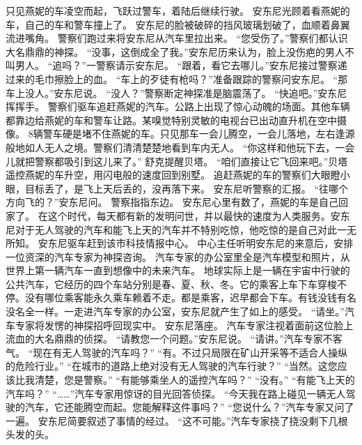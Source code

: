 \documentclass[a4paper,12pt,UTF8,twoside]{ctexbook}
\begin{document}
        只见燕妮的车凌空而起，飞跃过警车，着陆后继续行驶。 
        安东尼光顾着看燕妮的车，自己的车和警车撞上了。 
        安东尼的脸被破碎的挡风玻璃划破了，血顺着鼻翼流进嘴角。 
        警察们跑过来将安东尼从汽车里拉出来。 
        “您受伤了。”警察们都认识大名鼎鼎的神探。 
        “没事，这倒成全了我。”安东尼历来认为，脸上没伤疤的男人不叫男人。 
        “追吗？”一警察请示安东尼。 
        “跟着，看它去哪儿。”安东尼接过警察递过来的毛巾擦脸上的血。 
        “车上的歹徒有枪吗？”准备跟踪的警察问安东尼。 
        “那车上没人。”安东尼说。 
        “没人？”警察断定神探准是脑震荡了。 
        “快追吧。”安东尼挥挥手。 
        警察们驱车追赶燕妮的汽车。公路上出现了惊心动魄的场面。其他车辆都靠边给燕妮的车和警车让路。某嗅觉特别灵敏的电视台已出动直升机在空中摄像。 
        8辆警车硬是堵不住燕妮的车。只见那车一会儿腾空，一会儿落地，左右逢源般地如人无人之境。警察们清清楚楚地看到车内无人。 
        “你这样和他玩下去，一会儿就把警察都吸引到这儿来了。” 
        舒克提醒贝塔。 
        “咱们直接让它飞回来吧。”贝塔遥控燕妮的车升空，用闪电般的速度回到别墅。 
        追赶燕妮的车的警察们大眼瞪小眼，目标丢了，是飞上天后丢的，没再落下来。 
        安东尼听警察的汇报。 
        “往哪个方向飞的？”安东尼问。 
        警察指指东边。 
        安东尼心里有数了，燕妮的车是自己回家了。 
        在这个时代，每天都有新的发明问世，并以最快的速度为人类服务。安东尼对于无人驾驶的汽车和能飞上天的汽车并不特别吃惊，他吃惊的是自己对此一无所知。 
        安东尼驱车赶到该市科技情报中心。 
        中心主任听明安东尼的来意后，安排一位资深的汽车专家为神探咨询。 
        汽车专家的办公室里全是汽车模型和照片，从世界上第一辆汽车一直到想像中的未来汽车。 
        地球实际上是一辆在宇宙中行驶的公共汽车，它经历的四个车站分别是春、夏、秋、冬。它的乘客上车下车穿梭不停。没有哪位乘客能永久乘车赖着不走。都是乘客，迟早都会下车。有钱没钱有名没名全一样。一走进汽车专家的办公室，安东尼就产生了如上的感受。 
        “请坐。”汽车专家将发愣的神探招呼回现实中。 
        安东尼落座。 
        汽车专家注视着面前这位脸上流血的大名鼎鼎的侦探。 
        “请教您一个问题。”安东尼说。 
        “请讲。”汽车专家不客气。 
        “现在有无人驾驶的汽车吗？” 
        “有。不过只局限在矿山开采等不适合人操纵的危险行业。” 
        “在城市的道路上绝对没有无人驾驶的汽车行驶？” 
        “当然。这您应该比我清楚，您是警察。” 
        “有能够乘坐人的遥控汽车吗？” 
        “没有。” 
        “有能飞上天的汽车吗？” 
        “……”汽车专家用惊讶的目光回答侦探。 
        “今天我在路上碰见一辆无人驾驶的汽车，它还能腾空而起。您能解释这件事吗？” 
        “您说什么？”汽车专家又问了一遍。 
        安东尼简要叙述了事情的经过。 
        “这不可能。”汽车专家挠了挠没剩下几根头发的头。 
\end{document}
